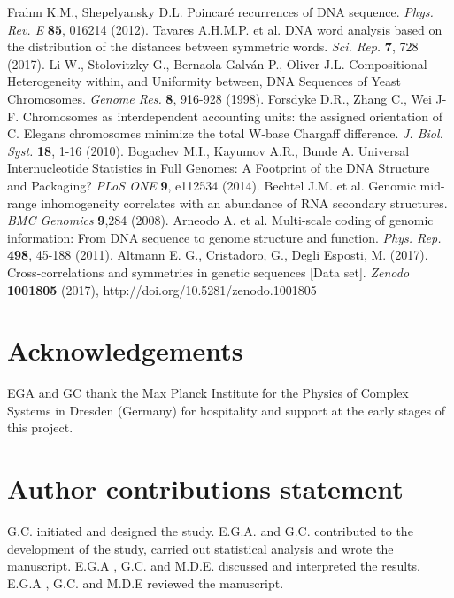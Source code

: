 \documentclass[fleqn,10pt]{wlscirep}
\begin{document}
\begin{thebibliography}{99}
  Frahm K.M.,   Shepelyansky D.L.   Poincar\'e recurrences of DNA sequence. {\it Phys. Rev. E} {\bf 85}, 016214 (2012). 
  Tavares A.H.M.P. {et al.}  DNA word analysis based on the distribution of the distances between symmetric words. {\it Sci. Rep.} {\bf 7}, 728 (2017).
  Li W.,  Stolovitzky G.,  Bernaola-Galv\'an P.,  Oliver  J.L.  Compositional Heterogeneity within, and Uniformity between, DNA Sequences of Yeast Chromosomes. {\it Genome Res.} {\bf  8}, 916-928 (1998).
 Forsdyke D.R., Zhang C., Wei J-F.  Chromosomes as interdependent accounting units: the assigned orientation of C. Elegans chromosomes minimize the total W-base Chargaff difference. {\it J. Biol. Syst.} {\bf 18}, 1-16 (2010).
  Bogachev M.I.,   Kayumov A.R.,  Bunde A.  Universal Internucleotide Statistics in Full Genomes: A Footprint of the DNA Structure and Packaging?  {\it PLoS ONE}   {\bf 9}, e112534 (2014).
 Bechtel J.M. et al. Genomic mid-range inhomogeneity correlates with an abundance of RNA secondary structures. {\it BMC Genomics} {\bf 9},284 (2008).
  Arneodo A. {et al.} Multi-scale coding of genomic information: From DNA sequence to genome structure and function. {\it Phys. Rep.}  {\bf 498}, 45-188  (2011).
 Altmann E. G., Cristadoro, G., Degli Esposti, M. (2017). Cross-correlations and symmetries in genetic sequences [Data set]. {\it Zenodo} {\bf 1001805} (2017), http://doi.org/10.5281/zenodo.1001805  
\end{thebibliography}




\section*{Acknowledgements}

EGA and GC thank the Max Planck Institute for the Physics of Complex Systems in Dresden (Germany) for hospitality and support at the early stages of this project.

\section*{Author contributions statement}
G.C.  initiated and designed the study.   E.G.A.  and G.C. contributed to the development of the study, carried out statistical analysis and wrote the manuscript. E.G.A , G.C.  and M.D.E. discussed  and interpreted the results.   E.G.A , G.C.  and M.D.E  reviewed the manuscript.
\end{document}
